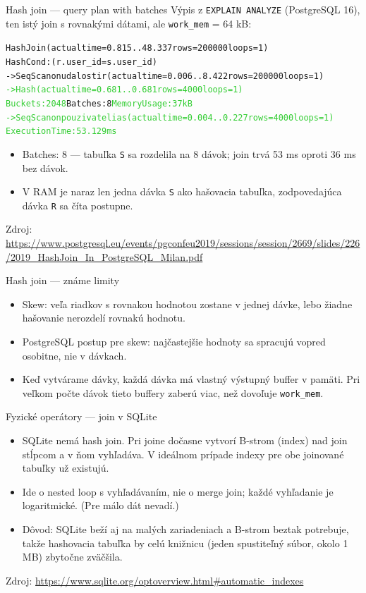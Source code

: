 \documentclass[12pt]{beamer}
\def\blue#1{\textcolor{Cerulean}{#1}}
\def\green#1{\textcolor{LimeGreen}{#1}}
\begin{document}
\begin{frame}[fragile]{Hash join --- query plan with batches}
Výpis z \texttt{EXPLAIN ANALYZE} (PostgreSQL 16),\\
ten istý join s rovnakými dátami, ale \texttt{work\_mem} = 64 kB:
{\tiny
\begin{alltt}
Hash Join (actual time=0.815..48.337 rows=200000 loops=1)
  Hash Cond: (r.\blue{user\_id} = s.\blue{user\_id})
  \alert{->  Seq Scan on udalosti r (actual time=0.006..8.422 rows=200000 loops=1)}
  \green{->  Hash (actual time=0.681..0.681 rows=4000 loops=1)}
        \green{Buckets: 2048  }\alert{Batches: 8}\green{  Memory Usage: 37kB}
        \green{->  Seq Scan on pouzivatelia s (actual time=0.004..0.227 rows=4000 loops=1)}
\green{Execution Time: 53.129 ms}
\end{alltt}
}
\begin{itemize}
\item \alert{Batches: 8} --- tabuľka \texttt{S} sa rozdelila na 8 dávok; join trvá 53 ms oproti 36 ms bez dávok.
\item V RAM je naraz len jedna dávka \texttt{S} ako hašovacia tabuľka,
zodpovedajúca dávka \texttt{R} sa číta postupne.
\end{itemize}
{\tiny Zdroj: \url{https://www.postgresql.eu/events/pgconfeu2019/sessions/session/2669/slides/226/2019_HashJoin_In_PostgreSQL_Milan.pdf}}
\end{frame}

\begin{frame}{Hash join --- známe limity}
\begin{itemize}
\item \alert{Skew}: veľa riadkov s rovnakou hodnotou zostane v jednej dávke, lebo žiadne hašovanie nerozdelí rovnakú hodnotu.
\item PostgreSQL postup pre skew: najčastejšie hodnoty sa spracujú vopred osobitne, nie v dávkach.
\item Keď vytvárame dávky, každá dávka má vlastný výstupný buffer v pamäti. Pri veľkom počte dávok tieto buffery zaberú viac, než dovoľuje \texttt{work\_mem}.
\end{itemize}
\end{frame}

\begin{frame}[fragile]{Fyzické operátory --- join v SQLite}
\begin{itemize}
\item SQLite nemá hash join. Pri joine dočasne vytvorí B-strom (index) nad join stĺpcom a v ňom vyhľadáva.
V ideálnom prípade indexy pre obe joinované tabuľky už existujú.
\item Ide o nested loop s vyhľadávaním, nie o merge join; každé vyhľadanie je logaritmické. (Pre málo dát nevadí.)
\item Dôvod: SQLite beží aj na malých zariadeniach a B-strom beztak potrebuje,
takže hashovacia tabuľka by celú knižnicu (jeden spustiteľný súbor, okolo 1 MB) zbytočne zväčšila.
\end{itemize}
{\tiny Zdroj: \url{https://www.sqlite.org/optoverview.html\#automatic_indexes}}
\end{frame}
\end{document}
